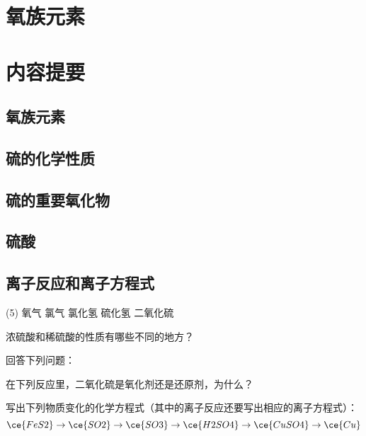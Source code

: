 \section{氧族元素}
\begin{Practice}[习题]
  \begin{question}
    \item 
    \item 
  \end{question}
\end{Practice}
\section*{内容提要}
\subsection{氧族元素}
\subsection{硫的化学性质}
\subsection{硫的重要氧化物}
\subsection{硫酸}
\subsection{离子反应和离子方程式}
\begin{Review}
  \begin{question}
    \item
    \begin{tasks}(5)
      \task 氧气
      \task 氯气
      \task 氯化氢
      \task 硫化氢
      \task 二氧化硫
    \end{tasks}
    \item 浓硫酸和稀硫酸的性质有哪些不同的地方？
    \item 回答下列问题：
    \begin{tasks}
      \task 
      \task 
      \task 
    \end{tasks}
    \item
    \item
    \item
    \item
    \item 在下列反应里，二氧化硫是氧化剂还是还原剂，为什么？
    \begin{tasks}
      \task {}
      \task {}
    \end{tasks}
    \item 写出下列物质变化的化学方程式（其中的离子反应还要写出相应的离子方程式）：
    \[ \ce{FeS2} \to \ce{SO2} \to \ce{SO3} \to \ce{H2SO4} \to \ce{CuSO4} \to \ce{Cu} \]
  \end{question}
\end{Review}